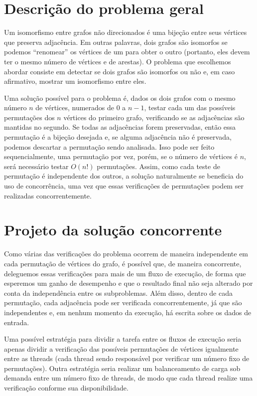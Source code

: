 \section{Descrição do problema geral}

  Um isomorfismo entre grafos não direcionados é uma bijeção entre seus vértices que preserva adjacência. Em outras palavras, dois grafos são isomorfos se podemos ``renomear'' os vértices de um para obter o outro (portanto, eles devem ter o mesmo número de vértices e de arestas). O problema que escolhemos abordar consiste em detectar se dois grafos são isomorfos ou não e, em caso afirmativo, mostrar um isomorfismo entre eles.

  Uma solução possível para o problema é, dados os dois grafos com o mesmo número $n$ de vértices, numerados de $0$ a $n-1$, testar cada um das possíveis permutações dos $n$ vértices do primeiro grafo, verificando se as adjacências são mantidas no segundo. Se todas as adjacências forem preservadas, então essa permutação é a bijeção desejada e, se alguma adjacência não é preservada, podemos descartar a permutação sendo analisada. Isso pode ser feito sequencialmente, uma permutação por vez, porém, se o número de vértices é $n$, será necessário testar $O(n!)$ permutações. Assim, como cada teste de permutação é independente dos outros, a solução naturalmente se beneficia do uso de concorrência, uma vez que essas verificações de permutações podem ser realizadas concorrentemente.


\section{Projeto da solução concorrente}

  Como várias das verificações do problema ocorrem de maneira independente em cada permutação de vértices do grafo, é possível que, de maneira concorrente, deleguemos essas verificações para mais de um fluxo de execução, de forma que esperemos um ganho de desempenho e que o resultado final não seja alterado por conta da independência entre os subproblemas. Além disso, dentro de cada permutação, cada adjacência pode ser verificada concorrentemente, já que são independentes e, em nenhum momento da execução, há escrita sobre os dados de entrada.

  Uma possível estratégia para dividir a tarefa entre os fluxos de execução seria apenas dividir a verificação das possíveis permutações de vértices igualmente entre as threads (cada thread sendo responsável por verificar um número fixo de permutações). Outra estratégia seria realizar um balanceamento de carga sob demanda entre um número fixo de threads, de modo que cada thread realize uma verificação conforme sua disponibilidade.

